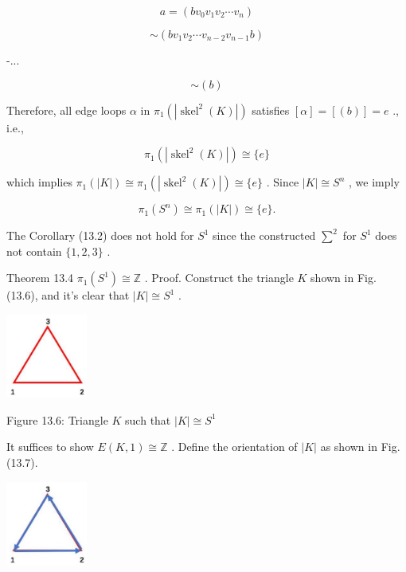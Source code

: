 \[
a = \left( {b{v}_{0}{v}_{1}{v}_{2}\cdots {v}_{n}}\right)
\]

\[
\sim  \left( {b{v}_{1}{v}_{2}\cdots {v}_{n - 2}{v}_{n - 1}b}\right)
\]

-...

\[
\sim  \left( b\right)
\]

Therefore, all edge loops \(\alpha\) in \({\pi }_{1}\left( \left| {{\operatorname{skel}}^{2}\left( K\right) }\right| \right)\) satisfies \(\left\lbrack  \alpha \right\rbrack   = \left\lbrack  \left( b\right) \right\rbrack   = e\) ., i.e.,

\[
{\pi }_{1}\left( \left| {{\operatorname{skel}}^{2}\left( K\right) }\right| \right)  \cong  \{ e\}
\]

which implies \({\pi }_{1}\left( \left| K\right| \right)  \cong  {\pi }_{1}\left( \left| {{\operatorname{skel}}^{2}\left( K\right) }\right| \right)  \cong  \{ e\}\) . Since \(\left| K\right|  \cong  {S}^{n}\) , we imply

\[
{\pi }_{1}\left( {S}^{n}\right)  \cong  {\pi }_{1}\left( \left| K\right| \right)  \cong  \{ e\} .
\]

The Corollary (13.2) does not hold for \({S}^{1}\) since the constructed \({\sum }^{2}\) for \({S}^{1}\) does not contain \(\{ 1,2,3\}\) .

Theorem 13.4 \({\pi }_{1}\left( {S}^{1}\right)  \cong  \mathbb{Z}\) . Proof. Construct the triangle \(K\) shown in Fig. (13.6), and it’s clear that \(\left| K\right|  \cong  {S}^{1}\) .

\begin{center}
\includegraphics[max width=0.2\textwidth]{images/bo_d2bcsrref24c73avs720_136_687_315_260_269_0.jpg}
\end{center}
\hspace*{3em} 

Figure 13.6: Triangle \(K\) such that \(\left| K\right|  \cong  {S}^{1}\)

It suffices to show \(E\left( {K,1}\right)  \cong  \mathbb{Z}\) . Define the orientation of \(\left| K\right|\) as shown in Fig. (13.7).

\begin{center}
\includegraphics[max width=0.2\textwidth]{images/bo_d2bcsrref24c73avs720_136_695_820_235_245_0.jpg}
\end{center}
\hspace*{3em} 

